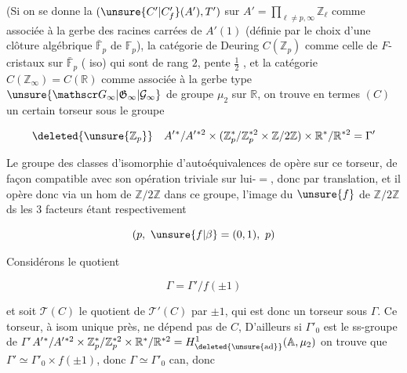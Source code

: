 
(Si on se donne la  
$(\unsure{C'|C'_f}(A'),T')$ sur $A'=\prod_{\ell\ne p,\infty}\mathbb Z_\ell$ comme
associée à la gerbe des racines carrées de $A'(1)$ (définie
par le choix d'une clôture algébrique $\bar{\mathbb F}_p$ de $\mathbb F_p$),  la
catégorie de Deuring $C(\mathbb Z_p)$ comme celle de $F$-cristaux sur $\bar{\mathbb F}_p$
( iso) qui sont de rang $2$,  pente $\frac12$ , et la 
catégorie $C(\mathbb Z_\infty)=C(\mathbb R)$ comme associée à la gerbe
type $\unsure{\mathscr G_\infty|\mathfrak G_\infty|\mathcal G_\infty}$ de groupe $\mu_2$ sur $\mathbb R$, on trouve en termes  $(C)$ un
certain torseur  sous le groupe

\[
\deleted{\unsure{\mathbb Z_p}}\quad A'{}^*/A'{}^{*2}\times
(\mathbb Z_p^*/\mathbb Z_p^{*2}\times\mathbb Z/2\mathbb Z)
\times\mathbb R^*/\mathbb R^{*2}=\Gamma'
\]

Le groupe  des classes d'isomorphie d'autoéquivalences de
 opère sur ce torseur, de façon compatible avec
son opération triviale sur lui-$=$, donc par translation,
et il opère donc via un hom  de $\mathbb Z/2\mathbb Z$ dans ce groupe,
 l'image du  $\unsure{f}$ de $\mathbb Z/2\mathbb Z$ ds les 3 facteurs
étant respectivement

\[
(p,\ \unsure{f|\beta}=(0,1),\ p)
\]


Considérons le quotient

\[
\Gamma=\Gamma'/f(\pm1)
\]

et soit $\mathcal T(C)$ le quotient de $\mathcal T'(C)$ par $\pm1$, qui
est donc un torseur sous $\Gamma$. Ce torseur, à isom unique
près, ne dépend pas de $C$,  D'ailleurs si $\Gamma'_0$ est le
ss-groupe de $\Gamma'$\quad $A'{}^*/A'{}^{*2}\times\mathbb Z_p^*/\mathbb Z_p^{*2}\times\mathbb R^*/\mathbb R^{*2}
=H^1_{\deleted{\unsure{\mathrm{ad}}}}(\mathbb A,\mu_2)$ 
on trouve que $\Gamma'\simeq\Gamma'_0\times f(\pm1)$, donc $\Gamma\simeq\Gamma'_0$ can, donc
